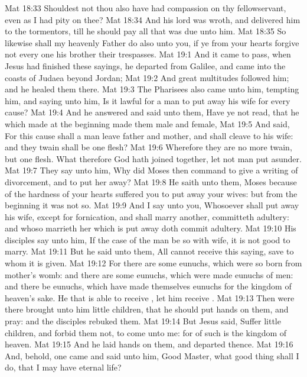 \vs Mat 18:33 Shouldest not thou also have had compassion on thy fellowservant, even as I had pity on thee?
\vs Mat 18:34 And his lord was wroth, and delivered him to the tormentors, till he should pay all that was due unto him.
\vs Mat 18:35 So likewise shall my heavenly Father do also unto you, if ye from your hearts forgive not every one his brother their trespasses.
\vs Mat 19:1 And it came to pass,  when Jesus had finished these sayings, he departed from Galilee, and came into the coasts of Judaea beyond Jordan;
\vs Mat 19:2 And great multitudes followed him; and he healed them there.
\vs Mat 19:3 The Pharisees also came unto him, tempting him, and saying unto him, Is it lawful for a man to put away his wife for every cause?
\vs Mat 19:4 And he answered and said unto them, Have ye not read, that he which made  at the beginning made them male and female,
\vs Mat 19:5 And said, For this cause shall a man leave father and mother, and shall cleave to his wife: and they twain shall be one flesh?
\vs Mat 19:6 Wherefore they are no more twain, but one flesh. What therefore God hath joined together, let not man put asunder.
\vs Mat 19:7 They say unto him, Why did Moses then command to give a writing of divorcement, and to put her away?
\vs Mat 19:8 He saith unto them, Moses because of the hardness of your hearts suffered you to put away your wives: but from the beginning it was not so.
\vs Mat 19:9 And I say unto you, Whosoever shall put away his wife, except  for fornication, and shall marry another, committeth adultery: and whoso marrieth her which is put away doth commit adultery.
\vs Mat 19:10 His disciples say unto him, If the case of the man be so with  wife, it is not good to marry.
\vs Mat 19:11 But he said unto them, All  cannot receive this saying, save  to whom it is given.
\vs Mat 19:12 For there are some eunuchs, which were so born from  mother's womb: and there are some eunuchs, which were made eunuchs of men: and there be eunuchs, which have made themselves eunuchs for the kingdom of heaven's sake. He that is able to receive , let him receive .
\vs Mat 19:13 Then were there brought unto him little children, that he should put  hands on them, and pray: and the disciples rebuked them.
\vs Mat 19:14 But Jesus said, Suffer little children, and forbid them not, to come unto me: for of such is the kingdom of heaven.
\vs Mat 19:15 And he laid  hands on them, and departed thence.
\vs Mat 19:16 And, behold, one came and said unto him, Good Master, what good thing shall I do, that I may have eternal life?

